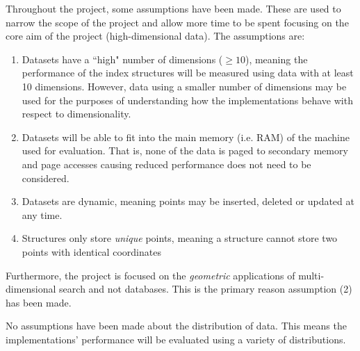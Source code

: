Throughout the project, some assumptions have been made. These are used to narrow the scope of the project and allow more time to be spent focusing on the core aim of the project (high-dimensional data). The assumptions are:
\begin{enumerate}
	\item Datasets have a ``high" number of dimensions ($\geq 10$), meaning the performance of the index structures will be measured using data with at least 10 dimensions. However, data using a smaller number of dimensions may be used for the purposes of understanding how the implementations behave with respect to dimensionality.
	\item Datasets will be able to fit into the main memory (i.e. RAM) of the machine used for evaluation. That is, none of the data is paged to secondary memory and page accesses causing reduced performance does not need to be considered.
	\item Datasets are dynamic, meaning points may be inserted, deleted or updated at any time.
	\item Structures only store \textit{unique} points, meaning a structure cannot store two points with identical coordinates
\end{enumerate}
Furthermore, the project is focused on the \textit{geometric} applications of multi-dimensional search and not databases. This is the primary reason assumption (2) has been made.

No assumptions have been made about the distribution of data. This means the implementations' performance will be evaluated using a variety of distributions.
